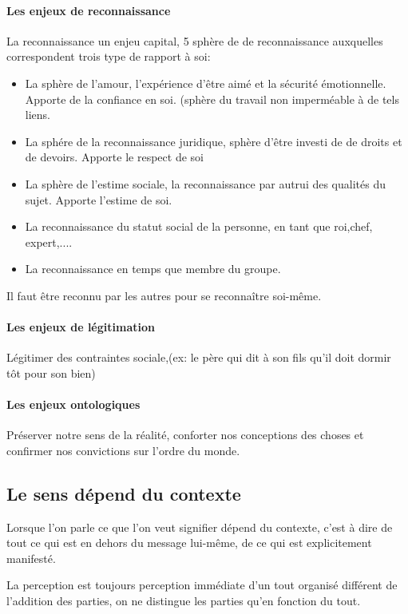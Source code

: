 \documentclass[11pt]{article} %
\begin{document}
		\paragraph{Les enjeux de reconnaissance}
		La reconnaissance un enjeu capital, 5 sphère de de reconnaissance auxquelles correspondent trois
		type de rapport à soi:
		\begin{itemize}
			\item La sphère de l'amour, l'expérience d'être aimé et la sécurité émotionnelle. Apporte de la 
			confiance en soi. (sphère du travail non imperméable à de tels liens.
			\item La sphére de la reconnaissance juridique, sphère d'être investi de de droits et de devoirs. 
			Apporte le respect de soi
			\item La sphère de l'estime sociale, la reconnaissance par autrui des qualités du sujet. Apporte
			l'estime de soi.
			\item La reconnaissance du statut social de la personne, en tant que roi,chef, expert,....
			\item La reconnaissance en temps que membre du groupe.
		\end{itemize}
		Il faut être reconnu par les autres pour se reconnaître soi-même.
		\paragraph{Les enjeux de légitimation} Légitimer des contraintes sociale,(ex: le père qui dit à son fils
		qu'il doit dormir tôt pour son bien)
		\paragraph{Les enjeux ontologiques} Préserver notre sens de la réalité, conforter nos conceptions des choses et confirmer nos convictions sur l'ordre du monde.


	\subsection{Le sens dépend du contexte}

	Lorsque l'on parle ce que l'on veut signifier dépend du contexte, c'est à dire de tout ce qui est en dehors du message lui-même, de ce qui est explicitement manifesté.

	La perception est toujours perception immédiate d'un tout organisé différent de l'addition des parties, on ne distingue les parties qu'en fonction du tout.
\end{document}
